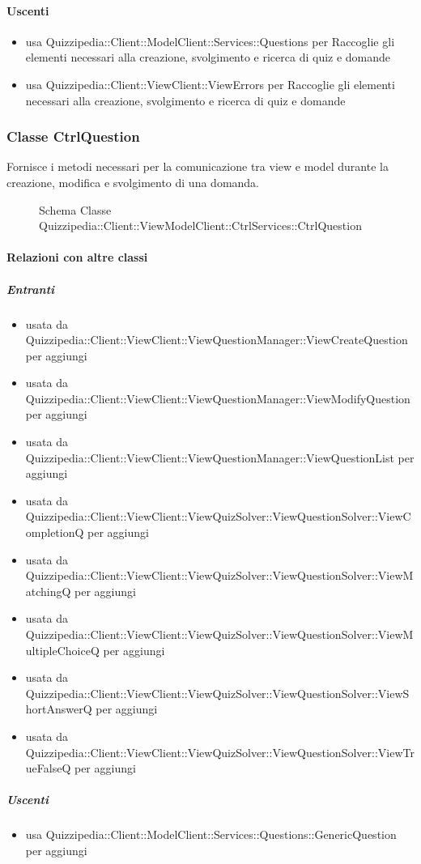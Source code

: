 \paragraph{Uscenti}
\begin{itemize}
\item usa Quizzipedia::Client::ModelClient::Services::Questions per Raccoglie gli elementi necessari alla creazione, svolgimento e ricerca di quiz e domande
\item usa Quizzipedia::Client::ViewClient::ViewErrors per Raccoglie gli elementi necessari alla creazione, svolgimento e ricerca di quiz e domande
\end{itemize}
\subsubsection{Classe CtrlQuestion}
Fornisce i metodi necessari per la comunicazione tra view e model durante la creazione, modifica e svolgimento di una domanda.
\begin{figure}[H]
\centering
\noindent{}
\caption[Schema Classe CtrlQuestion]{Schema Classe Quizzipedia::Client::ViewModelClient::CtrlServices::CtrlQuestion}
\end{figure}
\paragraph{Relazioni con altre classi}
\subparagraph{Entranti}
\begin{itemize}
\item usata da Quizzipedia::Client::ViewClient::ViewQuestionManager::ViewCreateQuestion per aggiungi
\item usata da Quizzipedia::Client::ViewClient::ViewQuestionManager::ViewModifyQuestion per aggiungi
\item usata da Quizzipedia::Client::ViewClient::ViewQuestionManager::ViewQuestionList per aggiungi
\item usata da Quizzipedia::Client::ViewClient::ViewQuizSolver::ViewQuestionSolver::ViewCompletionQ per aggiungi
\item usata da Quizzipedia::Client::ViewClient::ViewQuizSolver::ViewQuestionSolver::ViewMatchingQ per aggiungi
\item usata da Quizzipedia::Client::ViewClient::ViewQuizSolver::ViewQuestionSolver::ViewMultipleChoiceQ per aggiungi
\item usata da Quizzipedia::Client::ViewClient::ViewQuizSolver::ViewQuestionSolver::ViewShortAnswerQ per aggiungi
\item usata da Quizzipedia::Client::ViewClient::ViewQuizSolver::ViewQuestionSolver::ViewTrueFalseQ per aggiungi
\end{itemize}
\subparagraph{Uscenti}
\begin{itemize}
\item usa Quizzipedia::Client::ModelClient::Services::Questions::GenericQuestion per aggiungi
\end{itemize}

